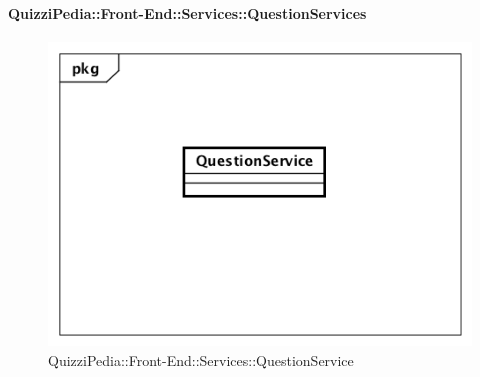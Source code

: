 \paragraph{QuizziPedia::Front-End::Services::QuestionServices}
\begin{figure}
	\centering
	\includegraphics[scale=0.45]{UML/Classi/Front-End/QuizziPedia_Front-end_Services_ QuestionService.png}
	\caption{QuizziPedia::Front-End::Services::QuestionService}
\end{figure}
